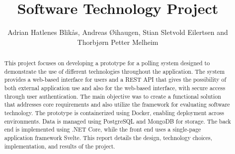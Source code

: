 \documentclass[11pt]{article}
\begin{document}
\title{Software Technology Project}

\author{Adrian Hatlenes Blikås, Andreas Øihaugen, Stian Sletvold Eilertsen and Thorbjørn Petter Melheim}

\maketitle

\begin{abstract}
  This project focuses on developing a prototype for a polling system designed to demonstrate the use of different technologies throughout the application. 
  The system provides a web-based interface for users and a REST API that gives the possibility of both external application use and also for the web-based interface, with secure access through user authentication. 
  The main objective was to create a functional solution that addresses core requirements and also utilize the framework for evaluating software technology. 
  The prototype is containerized using Docker, enabling deployment across environments. 
  Data is managed using PostgreSQL and MongoDB for storage. 
  The back end is implemented using .NET Core, while the front end uses a single-page application framework Svelte.
  This report details the design, technology choices, implementation, and results of the project.
\end{abstract}

\newpage
\tableofcontents
\newpage

%











\newpage
{}

{}
\end{document}
